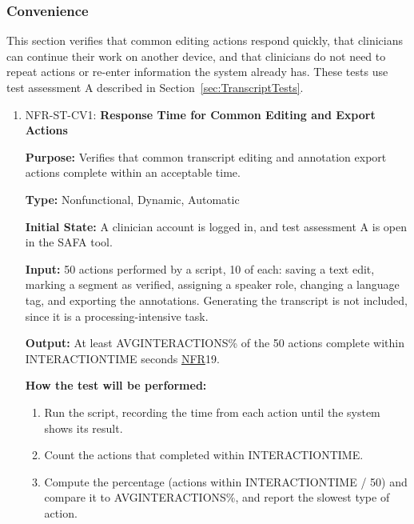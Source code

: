\documentclass[12pt, titlepage]{article}
\newcommand{\srsnfr}[1]{\href{https://github.com/Nour-Fawaz/MacaBoca/blob/main/pdfs/SRS/SRS.pdf}{NFR}}
\renewcommand{\_}{\oldunderscore\allowbreak}
\begin{document}
\subsubsection{Convenience}
This section verifies that common editing actions respond quickly, that clinicians can continue their work on another device, and that clinicians do not need to repeat actions or re-enter information the system already has. 
These tests use test assessment A described in Section~\ref{sec:TranscriptTests}.
\begin{enumerate}
  \item NFR-ST-CV1: \textbf{Response Time for Common Editing and Export Actions\\}
  \begin{mdframed}[linewidth=0.5mm]
      \textbf{Purpose:} Verifies that common transcript editing and annotation export actions complete within an acceptable time. \par
      \textbf{Type:} Nonfunctional, Dynamic, Automatic \par
      \textbf{Initial State:} A clinician account is logged in, and test assessment A is open in the SAFA tool. \par
      \textbf{Input:} 50 actions performed by a script, 10 of each: saving a text edit, marking a segment as verified, assigning a speaker role, changing a language tag, and exporting the annotations. Generating the transcript is not included, since it is a processing-intensive task. \par
      \textbf{Output:} At least AVG\_INTERACTIONS\% of the 50 actions complete within INTERACTION\_TIME seconds \srsnfr*{19}. \par
      \textbf{How the test will be performed:}
      \begin{enumerate}
        \item[1.] Run the script, recording the time from each action until the system shows its result.
        \item[2.] Count the actions that completed within INTERACTION\_TIME.
        \item[3.] Compute the percentage (actions within INTERACTION\_TIME / 50) and compare it to AVG\_INTERACTIONS\%, and report the slowest type of action.
      \end{enumerate}
  \end{mdframed}


\end{enumerate}
\end{document}
